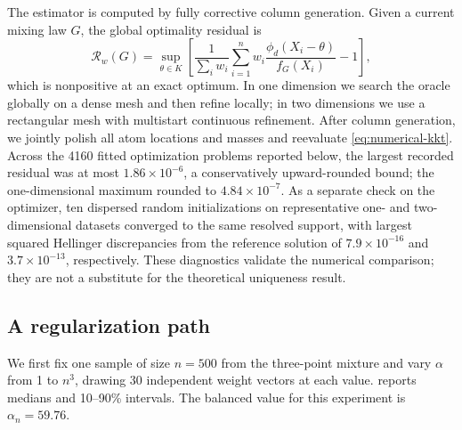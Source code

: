 \documentclass[11pt]{article}
\theoremstyle{definition}
\theoremstyle{remark}
\begin{document}
The estimator is computed by fully corrective column generation.  Given a
current mixing law $G$, the global optimality residual is
\begin{equation}\label{eq:numerical-kkt}
 \mathcal R_w(G)=
 \sup_{\theta\in K}\left[
 \frac{1}{\sum_iw_i}\sum_{i=1}^n
 w_i\frac{\phi_d(X_i-\theta)}{f_G(X_i)}-1
 \right],
\end{equation}
which is nonpositive at an exact optimum.  In one dimension we search the
oracle globally on a dense mesh and then refine locally; in two dimensions we
use a rectangular mesh with multistart continuous refinement.  After column
generation, we jointly polish all atom locations and masses and reevaluate
\eqref{eq:numerical-kkt}.  Across the 4160 fitted optimization problems
reported below, the largest recorded residual was at most
$1.86\times10^{-6}$, a conservatively upward-rounded bound; the
one-dimensional maximum rounded to $4.84\times10^{-7}$.  As a separate check
on the optimizer, ten dispersed random initializations on representative
one- and two-dimensional datasets converged to the same resolved support,
with largest squared Hellinger discrepancies from the reference solution of
$7.9\times10^{-16}$ and $3.7\times10^{-13}$, respectively.  These diagnostics
validate the numerical comparison; they are not a substitute for the
theoretical uniqueness result.

\subsection{A regularization path}

We first fix one sample of size $n=500$ from the three-point mixture and vary
$\alpha$ from 1 to $n^3$, drawing 30 independent weight vectors at each
value.   reports medians and 10--90\% intervals.  The balanced
value for this experiment is $\alpha_n=59.76$.
\end{document}
